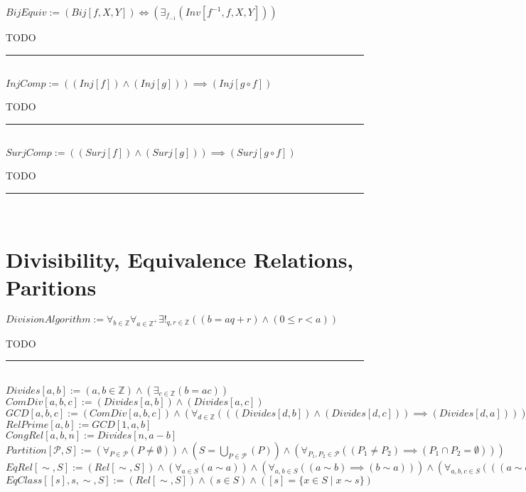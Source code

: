 \documentclass{book}
\newcommand{\abr}{:=}
\newcommand{\pr}[1]{\left(#1\right)}
\newcommand{\st}{\mathbin{|}}
\begin{document}
$BijEquiv \abr (Bij[f, X, Y]) \iff \pr{\exists_{f_{-1}}(Inv[f^{-1}, f, X, Y])}$ \\
\begin{enumerate}
  \lit TODO
\end{enumerate} \vspace{.75mm} \hrule \vspace{.75mm} \ \\ 

$InjComp \abr \pr{(Inj[f]) \land (Inj[g])} \implies (Inj[g \circ f])$
\begin{enumerate}
  \lit TODO
\end{enumerate} \vspace{.75mm} \hrule \vspace{.75mm} \ \\ 

$SurjComp \abr \pr{(Surj[f]) \land (Surj[g])} \implies (Surj[g \circ f])$
\begin{enumerate}
  \lit TODO
\end{enumerate} \vspace{.75mm} \hrule \vspace{.75mm} \ \\ 


\section{Divisibility, Equivalence Relations, Paritions}
$DivisionAlgorithm \abr \forall_{b \in \mathbb{Z}} \forall_{a \in \mathbb{Z}^+} \exists!_{q, r \in \mathbb{Z}}\pr{(b = a q + r) \land (0 \leq r < a)}$
\begin{enumerate}
  \lit TODO
\end{enumerate} \vspace{.75mm} \hrule \vspace{.75mm} \ \\ 

$Divides[a, b] \abr (a, b \in \mathbb{Z}) \land \pr{\exists_{c \in \mathbb{Z}}(b = a c)}$ \\
$ComDiv[a, b, c] \abr (Divides[a, b]) \land (Divides[a, c])$ \\
$GCD[a, b, c] \abr (ComDiv[a, b, c]) \land \pr{\forall_{d \in \mathbb{Z}}\pr{\pr{(Divides[d, b]) \land (Divides[d, c])} \implies (Divides[d, a])}}$ \\
$RelPrime[a, b] \abr GCD[1, a, b]$ \\
$CongRel[a, b, n] \abr Divides[n, a - b]$ \\

$Partition[\mathcal{P}, S] \abr \pr{\forall_{P \in \mathcal{P}}(P \neq \emptyset)} \land \pr{S = \bigcup\limits_{P \in \mathcal{P}}(P)} \land \pr{\forall_{P_1, P_2 \in \mathcal{P}}\pr{(P_1 \neq P_2) \implies (P_1 \cap P_2 = \emptyset)}}$ \\
$EqRel[\sim, S] \abr (Rel[\sim, S]) \land \pr{\forall_{a \in S}(a \sim a)} \land \pr{\forall_{a, b \in S}\pr{(a \sim b) \implies (b \sim a)}} \land \pr{\forall_{a, b, c \in S}\pr{\pr{(a \sim b) \land (b \sim c)} \implies (a \sim c)}}$ \\
$EqClass[[s], s, \sim, S] \abr (Rel[\sim, S]) \land (s \in S) \land ([s] = \{x \in S \st x \sim s\})$ \\
\end{document}
